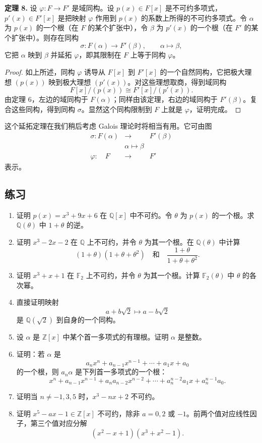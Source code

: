 \noindent\textbf{定理 8.} 设 $\varphi:F\to F'$ 是域同构。设 $p(x)\in F[x]$ 是不可约多项式，$p'(x)\in F'[x]$ 是把映射 $\varphi$ 作用到 $p(x)$ 的系数上所得的不可约多项式。令 $\alpha$ 为 $p(x)$ 的一个根（在 $F$ 的某个扩张中），令 $\beta$ 为 $p'(x)$ 的一个根（在 $F'$ 的某个扩张中）。则存在同构
\[
\sigma:F(\alpha)\longrightarrow F'(\beta),
\qquad
\alpha\longmapsto \beta,
\]
它把 $\alpha$ 映到 $\beta$ 并延拓 $\varphi$，即其限制在 $F$ 上等于同构 $\varphi$。

\begin{proof}
	如上所述，同构 $\varphi$ 诱导从 $F[x]$ 到 $F'[x]$ 的一个自然同构，它把极大理想 $(p(x))$ 映到极大理想 $(p'(x))$。对这些理想取商，得到域同构
	\[
	F[x]/(p(x))\cong F'[x]/(p'(x)).
	\]
	由定理 6，左边的域同构于 $F(\alpha)$；同样由该定理，右边的域同构于 $F'(\beta)$。复合这些同构，得到同构 $\sigma$。显然这个同构限制到 $F$ 上就是 $\varphi$，证明完成。
\end{proof}

这个延拓定理在我们稍后考虑 Galois 理论时将相当有用。它可由图
\[
\begin{array}{ccc}
	\sigma:
	F(\alpha)&\longrightarrow&F'(\beta)\\
	&\alpha\longmapsto\beta&\\[-2pt]
	\varphi:\quad F&\longrightarrow&F'
\end{array}
\]
表示。

\subsection*{练习}
\begin{enumerate}[label=\arabic*.]
	\item 证明 $p(x)=x^3+9x+6$ 在 $\mathbb Q[x]$ 中不可约。令 $\theta$ 为 $p(x)$ 的一个根。求 $\mathbb Q(\theta)$ 中 $1+\theta$ 的逆。
	
	\item 证明 $x^3-2x-2$ 在 $\mathbb Q$ 上不可约，并令 $\theta$ 为其一个根。在 $\mathbb Q(\theta)$ 中计算
	\[
	(1+\theta)(1+\theta+\theta^2)
	\quad\text{和}\quad
	\frac{1+\theta}{1+\theta+\theta^2}.
	\]
	
	\item 证明 $x^3+x+1$ 在 $\mathbb F_2$ 上不可约，并令 $\theta$ 为其一个根。计算 $\mathbb F_2(\theta)$ 中 $\theta$ 的各次幂。
	
	\item 直接证明映射
	\[
	a+b\sqrt2\longmapsto a-b\sqrt2
	\]
	是 $\mathbb Q(\sqrt2)$ 到自身的一个同构。
	
	\item 设 $\alpha$ 是 $\mathbb Z[x]$ 中某个首一多项式的有理根。证明 $\alpha$ 是整数。
	
	\item 证明：若 $\alpha$ 是
	\[
	a_nx^n+a_{n-1}x^{n-1}+\cdots+a_1x+a_0
	\]
	的一个根，则 $a_n\alpha$ 是下列首一多项式的一个根：
	\[
	x^n+a_{n-1}x^{n-1}+a_na_{n-2}x^{n-2}+\cdots+a_n^{n-2}a_1x+a_n^{n-1}a_0.
	\]
	
	\item 证明当 $n\neq -1,3,5$ 时，$x^3-nx+2$ 不可约。
	
	\item 证明 $x^5-ax-1\in\mathbb Z[x]$ 不可约，除非 $a=0,2$ 或 $-1$。前两个值对应线性因子，第三个值对应分解
	\[
	(x^2-x+1)(x^3+x^2-1).
	\]
\end{enumerate}
